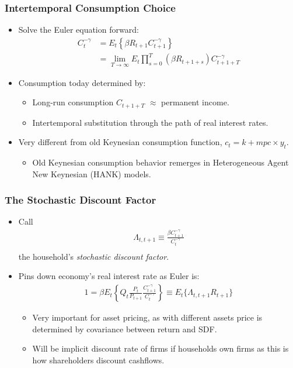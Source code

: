 \documentclass[english,xcolor=svgnames]{beamer}
\begin{document}
\begin{frame}
\frametitle{Intertemporal Consumption Choice}
\begin{itemize}
	\item Solve the Euler equation forward:
	\begin{align*}
		C_{t}^{-\gamma} &= E_t\left\{\beta R_{t+1}C_{t+1}^{-\gamma}\right\} \\
		&= \lim_{T\rightarrow\infty} E_t \prod_{s=0}^{T}(\beta R_{t+1+s}) C_{t+1+T}^{-\gamma}
	\end{align*}
	\item Consumption today determined by:
	\begin{itemize}
		\item Long-run consumption $C_{t+1+T}$ $\approx$ permanent income.
		\item Intertemporal substitution through the path of real interest rates.
	\end{itemize}
	\item Very different from old Keynesian consumption function, $c_t = k + mpc \times y_t$.
	\begin{itemize}
		\item Old Keynesian consumption behavior remerges in Heterogeneous Agent New Keynesian (HANK) models.
	\end{itemize}
\end{itemize}
\end{frame}


\begin{frame}
\frametitle{The Stochastic Discount Factor}
\begin{itemize}
	\item Call
	\begin{align*}
		\Lambda_{t,t+1}\equiv\frac{\beta C_{t+1}^{-\gamma}}{C_{t}^{-\gamma}} \\
	\end{align*}
	the household's \emph{stochastic discount factor}.
	
		\item Pins down economy's real interest rate as Euler is:
		\begin{align*}
		1 = \beta E_t\left\{Q_t \frac{P_t}{P_{t+1}} \frac{C_{t+1}^{-\gamma}}{C_{t}^{-\gamma}}\right\} \equiv E_t\{\Lambda_{t,t+1}R_{t+1}\}
	\end{align*}
	\begin{itemize}
		\item Very important for asset pricing, as with different assets price is determined by covariance between return and SDF.
		\item Will be implicit discount rate of firms if households own firms as this is how shareholders discount cashflows.
	\end{itemize}
\end{itemize}
\end{frame}
\end{document}
